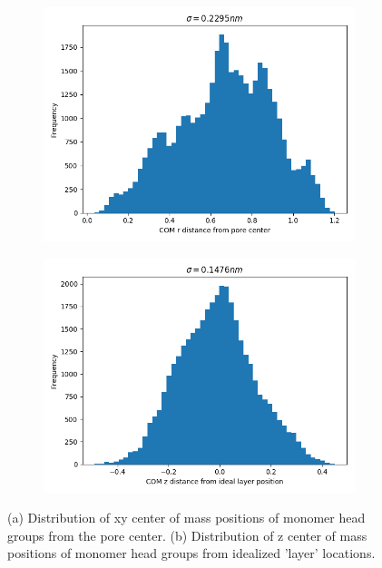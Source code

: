 \documentclass{article}
\begin{document}
  \begin{figure}[!htb]
  \centering
  \begin{subfigure}{0.45\textwidth}
  \includegraphics[width=\textwidth]{xy_com_distribution.png}
  \caption{}\label{fig:xy_com_distribution}
  \end{subfigure}
  \begin{subfigure}{0.45\textwidth}
  \includegraphics[width=\textwidth]{z_com_distribution.png}
  \caption{}\label{fig:z_com_distribution}
  \end{subfigure}
  \caption{(a) Distribution of xy center of mass positions of monomer head groups from
  the pore center. (b) Distribution of z center of mass positions of monomer head 
  groups from idealized 'layer' locations.}\label{fig:com_distribution}
  \end{figure}
\end{document}
